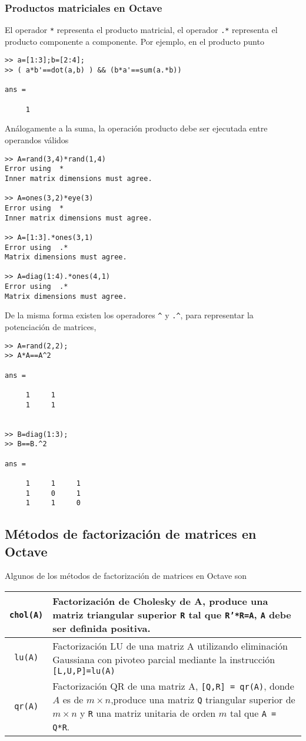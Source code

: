 \documentclass[letter,11pt]{article}
\newcommand{\octave}{{\sc Octave} }
\begin{document}
\subsubsection{Productos matriciales en \octave}
El operador \texttt{*} representa el producto matricial, el operador \texttt{.*} representa el producto componente 
a componente. Por ejemplo, en el producto punto
\begin{verbatim}
>> a=[1:3];b=[2:4];
>> ( a*b'==dot(a,b) ) && (b*a'==sum(a.*b))

ans =

     1
\end{verbatim}
An\'alogamente a la suma, la operaci\'on producto debe ser ejecutada entre operandos v\'alidos
\begin{multicols}{2}
\begin{verbatim}
>> A=rand(3,4)*rand(1,4)
Error using  * 
Inner matrix dimensions must agree.

>> A=ones(3,2)*eye(3)
Error using  * 
Inner matrix dimensions must agree.

>> A=[1:3].*ones(3,1)
Error using  .* 
Matrix dimensions must agree.
 
>> A=diag(1:4).*ones(4,1)
Error using  .* 
Matrix dimensions must agree.
\end{verbatim}
\end{multicols}
De la misma forma existen los operadores \texttt{\^} y \texttt{.\^}, para representar la potenciaci\'on de matrices,
\begin{multicols}{2}
\begin{verbatim}
>> A=rand(2,2);
>> A*A==A^2

ans =

     1     1
     1     1


>> B=diag(1:3);
>> B==B.^2

ans =

     1     1     1
     1     0     1
     1     1     0
\end{verbatim}
\end{multicols}

\subsection{M\'etodos de factorizaci\'on de matrices en \octave}

Algunos de los m\'etodos de factorizaci\'on de matrices en \octave son
\begin{longtable}{||c|p{}||}
\hline
\texttt{chol(A)}	&	Factorizaci\'on de Cholesky de A, produce una matriz triangular superior \texttt{R} tal que 
\texttt{R'*R=A}, \texttt{A} debe ser definida positiva.		\\ 	\hline
\texttt{lu(A)}		& 	Factorizaci\'on LU de una matriz A utilizando eliminación Gaussiana con pivoteo parcial mediante la instrucci\'on \texttt{[L,U,P]=lu(A)}	\\	\hline
\texttt{qr(A)}		& 	Factorizaci\'on QR de una matriz A, \texttt{[Q,R] = qr(A)}, donde $A$ es de $m\times n$,produce una matriz \texttt{Q} triangular superior de $m\times n$ y \texttt{R} una matriz unitaria de orden $m$ tal que \texttt{A = Q*R}.	\\	\hline
\end{longtable}
\end{document}
